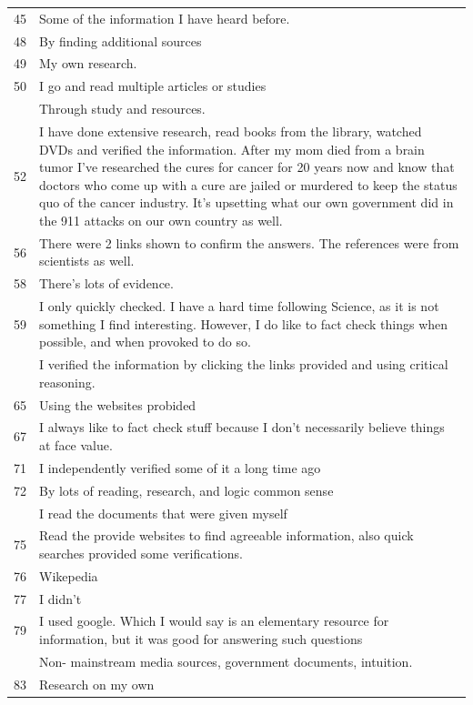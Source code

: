 \documentclass[
  doc,floatsintext]{apa6}
\begin{document}
\begin{longtable}[t]{>{}r>{\raggedright\arraybackslash}p{30em}}
45 & Some of the information I have heard before.\\
48 & By finding additional sources\\
49 & My own research.\\
50 & I go and read multiple articles or studies\\
\addlinespace
51 & Through study and resources.\\
52 & I have done extensive research, read books from the library, watched DVDs and verified the information. After my mom died from a brain tumor I've researched the cures for cancer for 20 years now and know that doctors who come up with a cure are jailed or murdered to keep the status quo of the cancer industry. It's upsetting what our own government did in the 911 attacks on our own country as well.\\
56 & There were 2 links shown to confirm the answers.  The references were from scientists as well.\\
58 & There's lots of evidence.\\
59 & I only quickly checked. I have a hard time following Science, as it is not something I find interesting. However, I do like to fact check things when possible, and when provoked to do so.\\
\addlinespace
60 & I verified the information by clicking the links provided and using critical reasoning.\\
65 & Using the websites probided\\
67 & I always like to fact check stuff because I don't necessarily believe things at face value.\\
71 & I independently verified some of it a long time ago\\
72 & By lots of reading, research, and logic common sense\\
\addlinespace
74 & I read the documents that were given myself\\
75 & Read the provide websites to find agreeable information, also quick searches provided some verifications.\\
76 & Wikepedia\\
77 & I didn't\\
79 & I used google. Which I would say is an elementary resource for information, but it was good for answering such questions\\
\addlinespace
82 & Non- mainstream media sources, government documents, intuition.\\
83 & Research on my own\\

\end{longtable}
\end{document}
